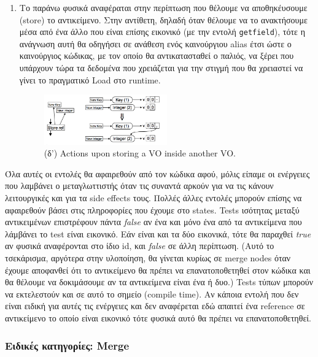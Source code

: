 \begin{enumerate}[label=\alph*]
\item Το παράνω φυσικά αναφέραται στην περίπτωση που θέλουμε να αποθηκέυσουμε
(store) το αντικείμενο. Στην αντίθετη, δηλαδή όταν θέλουμε να το ανακτήσουμε
μέσα από ένα άλλο που είναι επίσης εικονικό (με την εντολή \texttt{getfield}),
τότε η ανάγνωση αυτή θα οδηγήσει σε ανάθεση ενός καινούργιου alias έτσι ώστε ο
καινούργιος κώδικας, με τον οποίο θα αντικατασταθεί ο παλιός, να ξέρει που
υπάρχουν τώρα τα δεδομένα που χρειάζεται για την στιγμή που θα χρειαστεί να
γίνει το πραγματικό Load στο runtime.

\begin{figure}[h]
\centering
\includegraphics[width=0.5\textwidth]{virtual-virtual-store.png}
\caption{(δ') Actions upon storing a VO inside another VO.}
\label{figure-24}
\end{figure}

\end{enumerate}

Όλα αυτές οι εντολές θα αφαιρεθούν από τον κώδικα αφού, μόλις είπαμε οι
ενέργειες που λαμβάνει ο μεταγλωττιστής όταν τις συναντά αρκούν για να τις
κάνουν λειτουργικές και για τα side effects τους. Πολλές άλλες εντολές μπορούν
επίσης να αφαιρεθούν βάσει στις πληροφορίες που έχουμε στο states. Tests
ισότητας μεταξύ αντικειμένων επιστρέφουν πάντα \textit{false} αν ένα και μόνο
ένα από τα αντικείμενα που λάμβάνει το test είναι εικονικό. Εάν είναι και τα δύο
εικονικά, τότε θα παραχθεί \textit{true} αν φυσικά αναφέρονται στο ίδιο id, και
\textit{false} σε άλλη περίπτωση. (Αυτό το τσεκάρισμα, αργότερα στην υλοποίηση,
θα γίνεται κυρίως σε merge nodes όταν έχουμε αποφανθεί ότι το αντικείμενο θα
πρέπει να επανατοποθετηθεί στον κώδικα και θα θέλουμε να δοκιμάσουμε αν τα
αντικείμενα είναι ένα ή δυο.) Tests τύπων μπορούν να εκτελεστούν και σε αυτό το
σημείο (compile time). Αν κάποια εντολή που δεν είναι ειδική για αυτές τις
ενέργειες και δεν αναφέρεται εδώ απαιτεί ένα reference σε αντικείμενο το οποίο
είναι εικονικό τότε φυσικά αυτό θα πρέπει να επανατοποθετηθεί.


\subsubsection{Ειδικές κατηγορίες: Merge}

